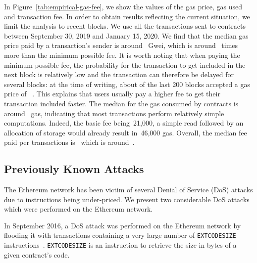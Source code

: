 In Figure~\ref{tab:empirical-gas-fee}, we show the values of the gas price, gas used and transaction fee. In order to obtain results reflecting the current situation, we limit the analysis to recent blocks. We use all the transactions sent to contracts between September 30, 2019 and January 15, 2020. We find that the median gas price paid by a transaction's sender is around~ Gwei, which is around~ times more than the minimum possible fee. It is worth noting that when paying the minimum possible fee, the probability for the transaction to get included in the next block is relatively low and the transaction can therefore be delayed for several blocks: at the time of writing, about  of the last 200 blocks accepted a gas price of ~\cite{eth-gas-station}. This explains that users usually pay a higher fee to get their transaction included faster. The median for the gas consumed by contracts is around~ gas, indicating that most transactions perform relatively simple computations. Indeed, the basic fee being~21,000, a simple read followed by an allocation of storage would already result in~46,000 gas. Overall, the median fee paid per transactions is~ which is around~.


\subsection{Previously Known Attacks}
The Ethereum network has been victim of several Denial of Service (DoS) attacks due to instructions being under-priced. We present two considerable DoS attacks which were performed on the Ethereum network.

In September 2016, a DoS attack was performed on the Ethereum network by flooding it with transactions containing a very large number of \lstinline{EXTCODESIZE} instructions~\cite{transaction-spam-attack}. \lstinline{EXTCODESIZE} is an instruction to retrieve the size in bytes of a given contract's code.

